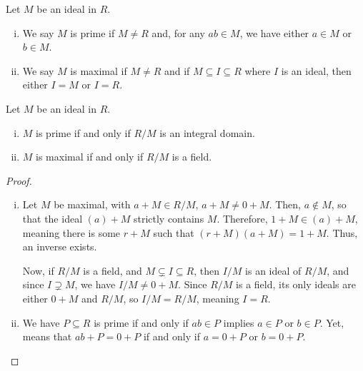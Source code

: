\documentclass[10pt]{mypackage}
\begin{document}
\begin{definition}
  Let $M$ be an ideal in $R$.
  \begin{enumerate}[(i)]
    \item We say $M$ is prime if $M\neq R$ and, for any $ab\in M$, we have either $a\in M$ or $b\in M$.
    \item We say $M$ is maximal if $M\neq R$ and if $M\subseteq I\subseteq R$ where $I$ is an ideal, then either $I = M$ or $I = R$.
  \end{enumerate}
\end{definition}
\begin{theorem}
  Let $M$ be an ideal in $R$.
  \begin{enumerate}[(i)]
    \item $M$ is prime if and only if $R/M$ is an integral domain.
    \item $M$ is maximal if and only if $R/M$ is a field.
  \end{enumerate}
\end{theorem}
\begin{proof}\hfill
  \begin{enumerate}[(i)]
    \item Let $M$ be maximal, with $a + M \in R/M$, $a + M \neq 0 + M$. Then, $a\notin M$, so that the ideal $\left( a \right) + M$ strictly contains $M$. Therefore, $1 + M\in \left( a \right) + M$, meaning there is some $r + M$ such that $ \left( r + M \right)\left( a + M \right) = 1 + M $. Thus, an inverse exists.\newline

      Now, if $R/M$ is a field, and $M \subsetneq I \subseteq R$, then $I/M$ is an ideal of $R/M$, and since $I\supsetneq M$, we have $I/M\neq 0 + M$. Since $R/M$ is a field, its only ideals are either $ 0 + M $ and $R/M$, so $I/M = R/M$, meaning $I = R$.
    \item We have $P\subseteq R$ is prime if and only if $ab\in P$ implies $a\in P$ or $b\in P$. Yet, means that $ab + P = 0 + P$ if and only if $ a = 0 + P $ or $b = 0 + P$.
  \end{enumerate}
\end{proof}
\end{document}

